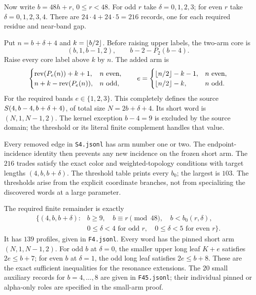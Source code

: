Now write $b=48h+r$, $0\le r<48$.  For odd $r$ take
$\delta=0,1,2,3$; for even $r$ take $\delta=0,1,2,3,4$.
There are $24\cdot4+24\cdot5=216$ records, one for each required
residue and near-band gap.

Put $n=b+\delta+4$ and $k=\left\lfloor b/2\right\rfloor$.  Before raising upper
labels, the two-arm core is
\[
 (b,1,b-1,2),\qquad b-2-P_2(b-4).
\]
Raise every core label above $k$ by $n$.  The added arm is
\[
 \begin{cases}
 \operatorname{rev}(P_e(n))+k+1,&n\text{ even},\\
 n+k-\operatorname{rev}(P_e(n)),&n\text{ odd},
 \end{cases}
\qquad
 e=\begin{cases}\left\lfloor n/2\right\rfloor-k-1,&n\text{ even},\\
 \left\lfloor n/2\right\rfloor-k,&n\text{ odd}.
 \end{cases}
\]
For the required bands $e\in\{1,2,3\}$.  This completely defines
the source $S\!\left(4,b-4,b+\delta+4\right)$, of total size
$N=2b+\delta+4$.  Its short word is $(N,1,N-1,2)$.
The kernel exception $b-4=9$ is excluded by the source domain;
the threshold or its literal finite complement handles that value.

Every removed edge in \texttt{S4.jsonl} has arm number one or two.
The endpoint-incidence identity then prevents any new incidence on
the frozen short arm.  The $216$ trades satisfy the exact color and
weighted-topology conditions with target lengths $(4,b,b+\delta)$.
The threshold table prints every $b_0$; the largest is $103$.
The thresholds arise from the explicit coordinate branches, not from
specializing the discovered words at a large parameter.

The required finite remainder is exactly
\begin{equation}\label{templates:min4-finite}
 \begin{aligned}
 \{(4,b,b+\delta):{}&b\ge9,\quad b\equiv r\pmod{48},\quad b<b_0(r,\delta),\\
                  &0\le\delta<4\text{ for odd }r,\quad
                   0\le\delta<5\text{ for even }r\}.
 \end{aligned}
\end{equation}
It has $139$ profiles, given in \texttt{F4.jsonl}.  Every word has
the pinned short arm $(N,1,N-1,2)$.  For odd $b$ at $\delta=0$,
the smaller upper long leaf $K+e$ satisfies $2e\le b+7$; for
even $b$ at $\delta=1$, the odd long leaf satisfies $2e\le b+8$.
These are the exact sufficient inequalities for the resonance
extensions.  The $20$ small auxiliary records for $b=4,\ldots,8$
are given in \texttt{F45.jsonl}; their individual pinned or alpha-only
roles are specified in the small-arm proof.

